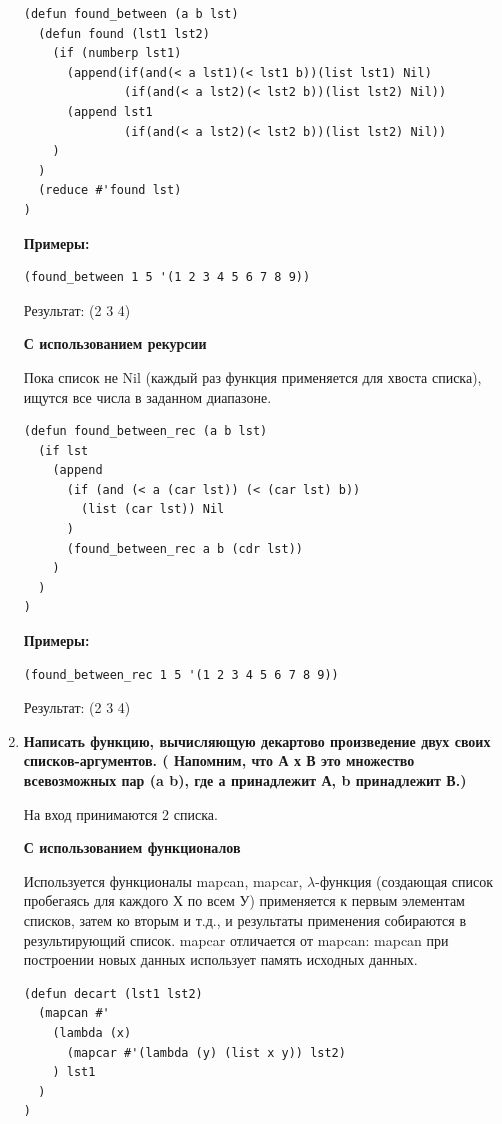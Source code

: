 \documentclass[a4paper,14pt]{extreport} %
\begin{document}
\begin{enumerate}
\begin{lstlisting}
(defun found_between (a b lst)
  (defun found (lst1 lst2)
    (if (numberp lst1)
      (append(if(and(< a lst1)(< lst1 b))(list lst1) Nil)
              (if(and(< a lst2)(< lst2 b))(list lst2) Nil))
      (append lst1
              (if(and(< a lst2)(< lst2 b))(list lst2) Nil))
    )
  )
  (reduce #'found lst)
)
\end{lstlisting}

\textbf{Примеры:}

\begin{lstlisting}
(found_between 1 5 '(1 2 3 4 5 6 7 8 9))
\end{lstlisting}

Результат: (2 3 4)

\textbf{С использованием рекурсии}

Пока список не Nil (каждый раз функция применяется для хвоста списка), ищутся все числа в заданном диапазоне. 

\begin{lstlisting}
(defun found_between_rec (a b lst)
  (if lst
    (append
      (if (and (< a (car lst)) (< (car lst) b)) 
      	(list (car lst)) Nil
      )
      (found_between_rec a b (cdr lst))
    )
  )
)
\end{lstlisting}

\textbf{Примеры:}

\begin{lstlisting}
(found_between_rec 1 5 '(1 2 3 4 5 6 7 8 9))
\end{lstlisting}

Результат: (2 3 4)

\item \textbf{Написать функцию, вычисляющую декартово произведение двух своих списков-аргументов. ( Напомним, что А х В это множество всевозможных пар (a b), где а принадлежит А, b принадлежит В.)}

На вход принимаются 2 списка. 

\textbf{С использованием функционалов}

Используется функционалы mapcan, mapcar, $\lambda$-функция (создающая список пробегаясь для каждого Х по всем У) применяется к первым элементам списков, затем ко вторым и т.д., и результаты применения собираются в результирующий список. mapcar отличается от mapcan: mapcan при построении новых данных использует память исходных данных.


\begin{lstlisting}
(defun decart (lst1 lst2)
  (mapcan #'
    (lambda (x)
      (mapcar #'(lambda (y) (list x y)) lst2)
    ) lst1
  )
)
\end{lstlisting}


\end{enumerate}
\end{document}
